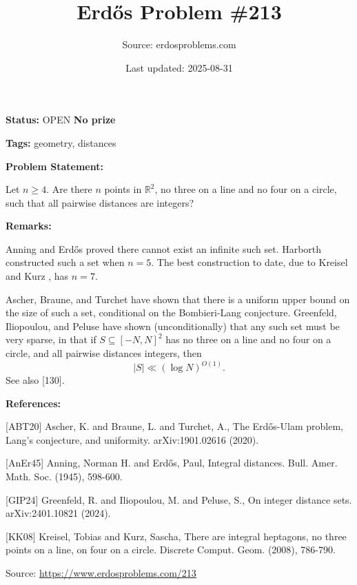 \documentclass{article}
\title{Erd\H{o}s Problem \#213}
\date{Last updated: 2025-08-31}
\author{Source: erdosproblems.com}
\begin{document}
\maketitle

\noindent\textbf{Status:} OPEN \quad \textbf{No prize}

\noindent\textbf{Tags:} geometry, distances

\medskip
\noindent\textbf{Problem Statement:}

Let $n\geq 4$. Are there $n$ points in $\mathbb{R}^2$, no three on a line and no four on a circle, such that all pairwise distances are integers?

\bigskip
\noindent\textbf{Remarks:}

Anning and Erd\H{o}s \cite{AnEr45} proved there cannot exist an infinite such set. Harborth constructed such a set when $n=5$. The best construction to date, due to Kreisel and Kurz \cite{KK08}, has $n=7$. 

Ascher, Braune, and Turchet \cite{ABT20} have shown that there is a uniform upper bound on the size of such a set, conditional on the Bombieri-Lang conjecture. Greenfeld, Iliopoulou, and Peluse \cite{GIP24} have shown (unconditionally) that any such set must be very sparse, in that if $S\subseteq [-N,N]^2$ has no three on a line and no four on a circle, and all pairwise distances integers, then\[\lvert S\rvert \ll (\log N)^{O(1)}.\]See also [130].

\bigskip
\noindent\textbf{References:}

[ABT20] Ascher, K. and Braune, L. and Turchet, A., The Erd\H{o}s-Ulam problem, Lang's conjecture, and uniformity. arXiv:1901.02616 (2020).
 
 [AnEr45] Anning, Norman H. and Erd\H{o}s, Paul, Integral distances. Bull. Amer. Math. Soc. (1945), 598-600.
 
 [GIP24] Greenfeld, R. and Iliopoulou, M. and Peluse, S., On integer distance sets. arXiv:2401.10821 (2024).
 
 [KK08] Kreisel, Tobias and Kurz, Sascha, There are integral heptagons, no three points on a line, on four on a circle. Discrete Comput. Geom. (2008), 786-790.

\bigskip
\noindent\small{Source: \url{https://www.erdosproblems.com/213}}
\end{document}
